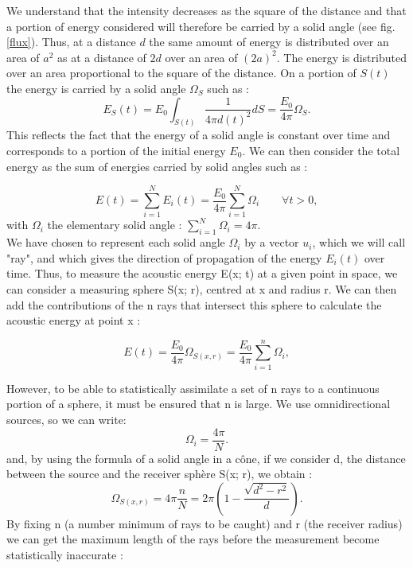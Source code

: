 \documentclass[AMA,STIX1COL]{WileyNJD-v2}
\begin{document}
We understand that the intensity decreases as the square of the distance and that a portion of energy considered will therefore be carried by a solid angle (see fig. \ref{flux}). Thus, at a distance $d$ the same amount of energy is distributed over an area of $a^2$ as at a distance of $2d$ over an area of $(2a)^2$. The energy is distributed over an area proportional to the square of the distance. On a portion of $S(t)$ the energy is carried by a solid angle $\Omega_{S}$ such as :
%
\begin{equation} \label{eq_energie}
E_{S}(t) = E_0 \int_{S(t)}  \frac{1}{4\pi  d(t)^2} dS = \frac{E_0}{4\pi}  \Omega_{S}.
\end{equation}
%
This reflects the fact that the energy of a solid angle is constant over time and corresponds to a portion of the initial energy $E_0$. We can then consider the total energy as the sum of energies carried by solid angles such as : 

\begin{equation}
E(t) = \sum_{i=1}^N E_i(t) = \frac{E_0}{4\pi}  \sum_{i=1}^N \Omega_i  \qquad \forall t > 0,
\end{equation}
with  $\Omega_i$ the elementary solid angle : $ \sum_{i=1}^N \Omega_i = 4\pi$. \\

We have chosen to represent each solid angle $ \Omega_i$ by a vector $u_i$, which we will call "ray", and which gives the direction of propagation of the energy $E_i(t)$ over time. Thus, to measure the acoustic energy E(x; t) at a given point in space, we can consider a measuring sphere S(x; r), centred at x and radius r. We can then add the contributions of the n rays that intersect this sphere to calculate the acoustic energy at point x :

\begin{equation}
E(t) = \frac{E_0}{4\pi}\Omega_{S(x,r)} = \frac{E_0}{4\pi}  \sum_{i=1}^n \Omega_i,
\end{equation}

However, to be able to statistically assimilate a set of n rays to a continuous portion of a sphere, it must be ensured that n is large. We use omnidirectional sources, so we can write:
\begin{equation}
	\Omega_i = \frac{4\pi}{N}.
\end{equation}
%
and, by using the formula of a solid angle in a cône, if we consider d, the distance between the source and the receiver sphère S(x; r), we obtain :
\begin{equation}
	\Omega_{S(x,r)} = 4\pi \frac{n}{N} = 2\pi \left(1- \frac{\sqrt{d^2-r^2}}{d}\right).
\end{equation}
%
By fixing n (a number minimum of rays to be caught) and r (the receiver radius) we can get the maximum length of the rays before the measurement become statistically inaccurate :
\end{document}
